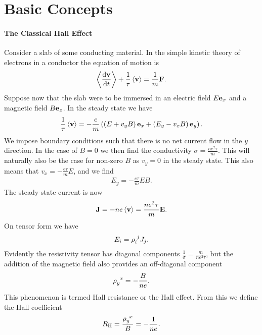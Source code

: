 \section{Basic Concepts}

\paragraph{The Classical Hall Effect}
Consider a slab of some conducting material. In the simple kinetic theory of electrons in a conductor the equation of motion is
\begin{align*}
	\expval{\dv{\vb{v}}{t}} + \frac{1}{\tau}\expval{\vb{v}} = \frac{1}{m}\vb{F}.
\end{align*}
Suppose now that the slab were to be immersed in an electric field $E\vb{e}_{x}$ and a magnetic field $B\vb{e}_{z}$. In the steady state we have
\begin{align*}
	\frac{1}{\tau}\expval{\vb{v}} = -\frac{e}{m}\left(\left(E + v_{y}B\right)\vb{e}_{x} + \left(E_{y} - v_{x}B\right)\vb{e}_{y}\right).
\end{align*}
We impose boundary conditions such that there is no net current flow in the $y$ direction. In the case of $B = 0$ we then find the conductivity $\sigma = \frac{ne^{2}\tau}{m}$. This will naturally also be the case for non-zero $B$ as $v_{y} = 0$ in the steady state. This also means that $v_{x} = -\frac{e\tau}{m}E$, and we find
\begin{align*}
	E_{y} = -\frac{e\tau}{m}EB.
\end{align*}
The steady-state current is now
\begin{align*}
	\vb{J} = -ne\expval{\vb{v}} = \frac{ne^{2}\tau}{m}\vb{E}.
\end{align*}
On tensor form we have
\begin{align*}
	E_{i} = \tensor{\rho}{_{i}^{j}}J_{j}.
\end{align*}
Evidently the resistivity tensor has diagonal components $\frac{1}{\sigma} = \frac{m}{ne^{2}\tau}$, but the addition of the magnetic field also provides an off-diagonal component
\begin{align*}
	\tensor{\rho}{_{y}^{x}} = -\frac{B}{ne}.
\end{align*}
This phenomenon is termed Hall resistance or the Hall effect. From this we define the Hall coefficient
\begin{align*}
	R_{\text{H}} = \frac{\tensor{\rho}{_{y}^{x}}}{B} = -\frac{1}{ne}.
\end{align*}

